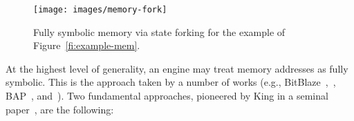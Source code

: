 \begin{figure}[t]
\texttt{[image: images/memory-fork]} 
\vspace{-4.5mm}
\caption{Fully symbolic memory via state forking for the example of Figure~\ref{fi:example-mem}.}
\label{fi:memory-fork}
\end{figure}

At the highest level of generality, an engine may treat memory addresses as fully symbolic. This is the approach taken by a number of works (e.g., {\sc BitBlaze}~\cite{BITBLAZE-ICISS08},~\cite{TLL-CAV10}, {\sc BAP}~\cite{BAP-CAV11}, and~\cite{TS-ATVA14}). Two fundamental approaches, pioneered by King in a seminal paper~\cite{K-CACM76}, are the following:

